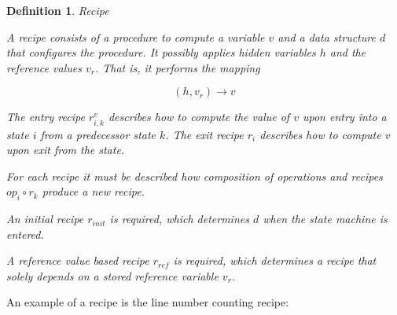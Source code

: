 \documentclass[12pt,a4paper]{scrartcl}
\newtheorem{definition}{Definition}
\begin{document}
\begin{definition} Recipe 

    A recipe consists of a procedure to compute a variable $v$ and a data
    structure $d$ that configures the procedure. It possibly applies hidden
    variables $h$ and the reference values $v_r$. That is, it performs the
    mapping

    \begin{equation} \label{eq:recipe-procedure}
        (h, v_r) \rightarrow v 
    \end{equation}

    The entry recipe $r^v_{i,k}$ describes how to compute the value of $v$ upon
    entry into a state $i$ from a predecessor state $k$. The exit recipe $r_i$
    describes how to compute $v$ upon exit from the state.

    For each recipe it must be described how composition of operations and
    recipes $op_i\circ r_k$ produce a new recipe. 

    An initial recipe $r_{init}$ is required, which determines $d$ when the
    state machine is entered. 

    A reference value based recipe $r_{ref}$ is required, which determines
    a recipe that solely depends on a stored reference variable $v_r$.

\end{definition}

An example of a recipe is the line number counting recipe:
\end{document}
